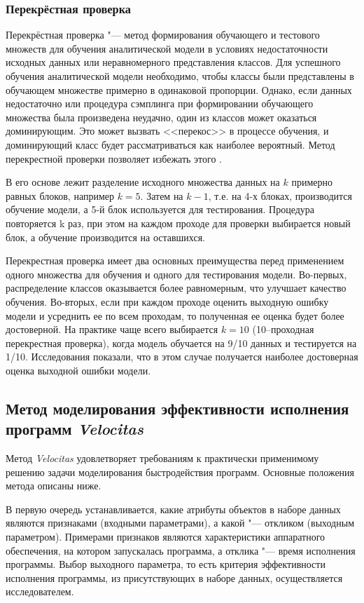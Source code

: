 \subsubsection{Перекрёстная проверка}
\label{sscross-validation}
Перекрёстная проверка "--- метод формирования обучающего и тестового множеств для обучения аналитической модели в условиях недостаточности исходных данных или неравномерного представления классов. Для успешного обучения аналитической модели необходимо, чтобы классы были представлены в обучающем множестве примерно в одинаковой пропорции. Однако, если данных недостаточно или процедура сэмплинга при формировании обучающего множества была произведена неудачно, один из классов может оказаться доминирующим. Это может вызвать <<перекос>> в процессе обучения, и доминирующий класс будет рассматриваться как наиболее вероятный. Метод перекрестной проверки позволяет избежать этого \cite{cross-validation}.

В его основе лежит разделение исходного множества данных на $k$ примерно равных блоков, например $k = 5$. Затем на $k - 1$, т.е. на 4-х блоках, производится обучение модели, а 5-й блок используется для тестирования. Процедура повторяется k раз, при этом на каждом проходе для проверки выбирается новый блок, а обучение производится на оставшихся.

Перекрестная проверка имеет два основных преимущества перед применением одного множества для обучения и одного для тестирования модели. Во-первых, распределение классов оказывается более равномерным, что улучшает качество обучения. Во-вторых, если при каждом проходе оценить выходную ошибку модели и усреднить ее по всем проходам, то полученная ее оценка будет более достоверной. На практике чаще всего выбирается $k = 10$ (10--проходная перекрестная проверка), когда модель обучается на 9/10 данных и тестируется на 1/10. Исследования показали, что в этом случае получается наиболее достоверная оценка выходной ошибки модели.


\subsection{Метод моделирования эффективности исполнения программ \textit{Velocitas}}
Метод \textit{Velocitas} удовлетворяет требованиям к практически применимому решению задачи моделирования быстродействия программ. Основные положения метода описаны ниже.

В первую очередь устанавливается, какие атрибуты объектов в наборе данных являются признаками (входными параметрами), а какой "--- откликом (выходным параметром). Примерами признаков являются характеристики аппаратного обеспечения, на котором запускалась программа, а отклика "--- время исполнения программы. Выбор выходного параметра, то есть критерия эффективности исполнения программы, из присутствующих в наборе данных, осуществляется исследователем.

